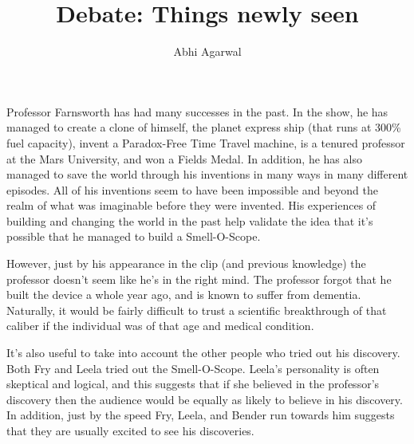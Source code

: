 \documentclass[11pt, oneside]{article}
\title{Debate: Things newly seen}
\author{Abhi Agarwal}
\date{}
\begin{document}
\maketitle




\par Professor Farnsworth has had many successes in the past. In the show, he has managed to create a clone of himself, the planet express ship (that runs at 300\% fuel capacity), invent a Paradox-Free Time Travel machine, is a tenured professor at the Mars University, and won a Fields Medal. In addition, he has also managed to save the world through his inventions in many ways in many different episodes. All of his inventions seem to have been impossible and beyond the realm of what was imaginable before they were invented. His experiences of building and changing the world in the past help validate the idea that it's possible that he managed to build a Smell-O-Scope.

\par However, just by his appearance in the clip (and previous knowledge) the professor doesn't seem like he's in the right mind. The professor forgot that he built the device a whole year ago, and is known to suffer from dementia. Naturally, it would be fairly difficult to trust a scientific breakthrough of that caliber if the individual was of that age and medical condition.


\par It's also useful to take into account the other people who tried out his discovery. Both Fry and Leela tried out the Smell-O-Scope. Leela's personality is often skeptical and logical, and this suggests that if she believed in the professor's discovery then the audience would be equally as likely to believe in his discovery. In addition, just by the speed Fry, Leela, and Bender run towards him suggests that they are usually excited to see his discoveries.
\end{document}
